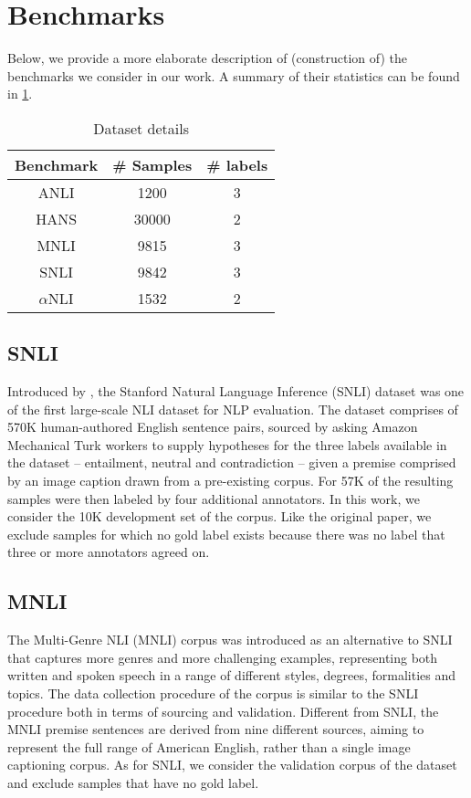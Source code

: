 \section{Benchmarks}
\label{app:benchmarks}

Below, we provide a more elaborate description of (construction of) the benchmarks we consider in our work.
A summary of their statistics can be found in \cref{tab:dataset}.

\begin{table}
\centering
\begin{tabular}{c|c|c}
    Benchmark & \# Samples & \# labels \\
    \hline
    ANLI & 1200 & 3 \\
    HANS & 30000 & 2 \\
    MNLI & 9815 & 3 \\
    SNLI & 9842 & 3 \\
    $\alpha$NLI & 1532 & 2 \\
\end{tabular}
\caption{Dataset details}
\label{tab:dataset}
\end{table}

\subsection{SNLI}
Introduced by \citet{bowman-etal-2015-large}, the Stanford Natural Language Inference (SNLI) dataset was one of the first large-scale NLI dataset for NLP evaluation.
The dataset comprises of 570K human-authored English sentence pairs, sourced by asking Amazon Mechanical Turk workers to supply hypotheses for the three labels available in the dataset -- entailment, neutral and contradiction -- given a premise comprised by an image caption drawn from a pre-existing corpus.
For 57K of the resulting samples were then labeled by four additional annotators.
In this work, we consider the 10K development set of the corpus.
Like the original paper, we exclude samples for which no gold label exists because there was no label that three or more annotators agreed on.

\subsection{MNLI}
The Multi-Genre NLI (MNLI) corpus \citep{williams-etal-2018-broad} was introduced as an alternative to SNLI that captures more genres and more challenging examples, representing both written and spoken speech in a range of different styles, degrees, formalities and topics.
The data collection procedure of the corpus is similar to the SNLI procedure both in terms of sourcing and validation.
Different from SNLI, the MNLI premise sentences are derived from nine different sources, aiming to represent the full range of American English, rather than a single image captioning corpus.
As for SNLI, we consider the validation corpus of the dataset and exclude samples that have no gold label.

